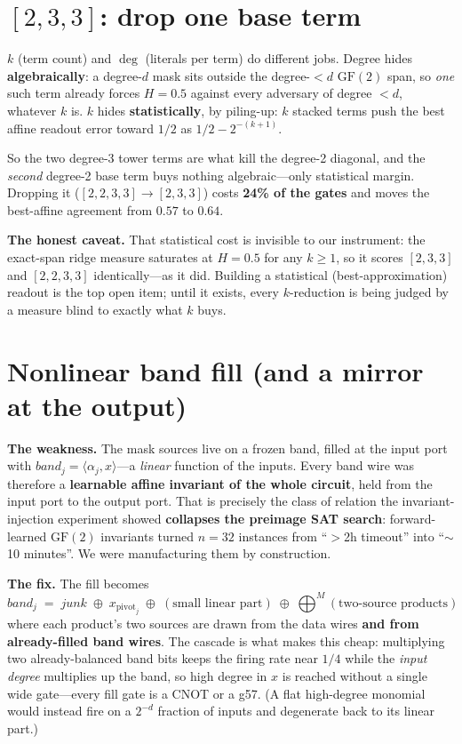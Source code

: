 \documentclass[11pt]{article}
\newcommand{\xor}{\oplus}
\begin{document}
\section{$[2,3,3]$: drop one base term}

$k$ (term count) and $\deg$ (literals per term) do different jobs. Degree hides
\textbf{algebraically}: a degree-$d$ mask sits outside the degree-$<d$
$\mathrm{GF}(2)$ span, so \emph{one} such term already forces $H=0.5$ against
every adversary of degree $<d$, whatever $k$ is. $k$ hides
\textbf{statistically}, by piling-up: $k$ stacked terms push the best affine
readout error toward $1/2$ as $1/2-2^{-(k+1)}$.

So the two degree-3 tower terms are what kill the degree-2 diagonal, and the
\emph{second} degree-2 base term buys nothing algebraic---only statistical
margin. Dropping it ($[2,2,3,3]\to[2,3,3]$) costs \textbf{24\% of the gates} and
moves the best-affine agreement from $0.57$ to $0.64$.

\textbf{The honest caveat.} That statistical cost is invisible to our
instrument: the exact-span ridge measure saturates at $H=0.5$ for any $k\ge1$,
so it scores $[2,3,3]$ and $[2,2,3,3]$ identically---as it did. Building a
statistical (best-approximation) readout is the top open item; until it exists,
every $k$-reduction is being judged by a measure blind to exactly what $k$ buys.

\section{Nonlinear band fill (and a mirror at the output)}

\textbf{The weakness.} The mask sources live on a frozen band, filled at the
input port with $\mathit{band}_j=\langle\alpha_j,x\rangle$---a \emph{linear}
function of the inputs. Every band wire was therefore a \textbf{learnable affine
invariant of the whole circuit}, held from the input port to the output port.
That is precisely the class of relation the invariant-injection experiment
showed \textbf{collapses the preimage SAT search}: forward-learned
$\mathrm{GF}(2)$ invariants turned $n{=}32$ instances from ``$>$2h timeout''
into ``$\sim$10 minutes''. We were manufacturing them by construction.

\textbf{The fix.} The fill becomes
\[
\mathit{band}_j \;=\; \mathit{junk}\;\xor\;x_{\mathrm{pivot}_j}\;\xor\;(\text{small linear part})\;\xor\;\bigoplus\nolimits^{M}(\text{two-source products})
\]
where each product's two sources are drawn from the data wires \textbf{and from
already-filled band wires}. The cascade is what makes this cheap: multiplying
two already-balanced band bits keeps the firing rate near $1/4$ while the
\emph{input degree} multiplies up the band, so high degree in $x$ is reached
without a single wide gate---every fill gate is a CNOT or a g57. (A flat
high-degree monomial would instead fire on a $2^{-d}$ fraction of inputs and
degenerate back to its linear part.)
\end{document}
